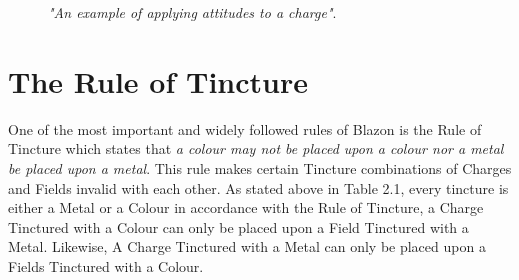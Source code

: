 \begin{figure}[H]
\hfill
{}
\hfill
\caption{\emph{"An example of applying attitudes to a charge"}.}

\end{figure}



\section{The Rule of Tincture}
One of the most important and widely followed rules of Blazon is the Rule of Tincture which states that \emph{a colour may not be placed upon a colour nor a metal be placed upon a metal}\cite[p.46]{ruleofTincture}.  This rule makes certain Tincture combinations of Charges and Fields invalid with each other.  As stated above in Table 2.1, every tincture is either a Metal or a Colour in accordance with the Rule of Tincture, a Charge Tinctured with a Colour can only be placed upon a Field Tinctured with a Metal.  Likewise, A Charge Tinctured with a Metal can only be placed upon a Fields Tinctured with a Colour.  

